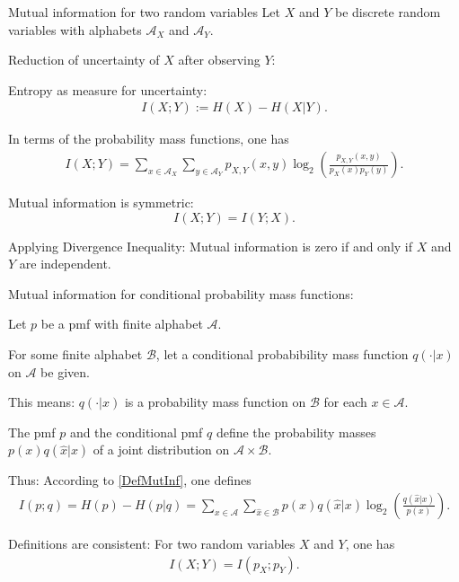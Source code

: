 \begin{frame}{Mutual information for two random variables}
Let $X$ and $Y$ be discrete random variables with alphabets $\mathcal{A}_X$ and $\mathcal{A}_Y$.

\bit
\item Reduction of uncertainty of $X$ after observing $Y$: 
\item[\iarrow] Entropy as measure for uncertainty: 
\begin{align}\label{DefMutInf}
I(X;Y):=H(X)-H(X|Y). 
\end{align}  
\item In terms of the probability mass functions, one has 
\begin{align*}
I(X;Y)=\sum_{x\in\mathcal{A}_X}\sum_{y\in\mathcal{A}_Y}p_{X,Y}(x,y)\log_2\left(\frac{p_{X,Y}(x,y)}{p_{X}(x)p_{Y}(y)}\right). 
\end{align*}
\item[\iarrow] Mutual information is symmetric:
\[
I(X;Y)=I(Y;X).
\]
\item[\iarrow]  Applying Divergence Inequality: Mutual information is zero if and only if $X$ and $Y$ are independent. 
\eit
\end{frame}
\begin{frame}{Mutual information for conditional probability mass functions:} 
\bit
\item Let $p$ be a pmf with finite alphabet $\mathcal{A}$. 
\item For some finite alphabet $\mathcal{B}$, let a conditional probabibility mass function $q(\cdot|x)$ on $\mathcal{A}$ be given. 
\item This means: $q(\cdot|x)$ is a probability mass function on $\mathcal{B}$ for 
each $x\in\mathcal{A}$. 
\item The pmf $p$ and the conditional pmf $q$ define the probability masses $p(x)q(\hat{x}|x)$ of a joint distribution on $\mathcal{A}\times\mathcal{B}$.
\item[\iarrow] Thus: According to \eqref{DefMutInf}, one defines
\begin{align*}%
I(p;q)=H(p)-H(p|q)=\sum_{x\in\mathcal{A}}\sum_{\hat{x}\in\mathcal{B}}p(x)q(\hat{x}|x)\log_2\left(\frac{q(\hat{x}|x)}{p(x)}\right).
\end{align*}
\item Definitions are consistent: For two random variables $X$ and $Y$, one has
\begin{align*}
I(X;Y)=I(p_X;p_Y). 
\end{align*}
\eit 
\end{frame}

